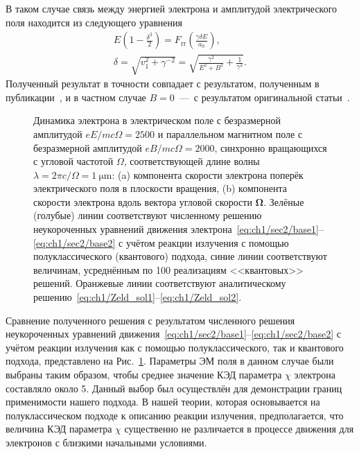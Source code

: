 В таком случае связь между энергией электрона и амплитудой электрического поля находится из следующего уравнения
\begin{gather}
    E \left(1 - \frac{\delta^2}{2}\right) = F_\mathrm{rr}\left(\frac{\gamma\delta E}{a_\mathrm{S}}\right) , \\
    \delta = \sqrt{v_1^2 + \gamma^{-2}} = \sqrt{\frac{\gamma^2}{E^2 + B^2} + \frac{1}{\gamma^2}}.
\end{gather}
Полученный результат в точности совпадает с результатом, полученным в публикации~\cite{Kostyukov2016}, и в частном случае $B=0$~---~с результатом оригинальной статьи~\cite{Zeldovich75}.
\begin{figure}[ht]
    \caption[Динамика электрона в синхронно вращающихся однородных параллельных электрическом и магнитном полях]{
    Динамика электрона в электрическом поле с безразмерной амплитудой $eE/mc\Omega = \num{2500}$ и параллельном магнитном поле с безразмерной амплитудой $eB/mc\Omega = \num{2000}$, синхронно вращающихся с угловой частотой $\Omega$, соответствующей длине волны $\lambda = 2\pi c /\Omega = \SI{1}{\um}$: (a) компонента скорости электрона поперёк электрического поля в плоскости вращения, (b) компонента скорости электрона вдоль вектора угловой скорости $\symbf{\Omega}$. Зелёные (голубые) линии соответствуют численному решению неукороченных уравнений движения электрона~\eqref{eq:ch1/sec2/base1}--\eqref{eq:ch1/sec2/base2} с учётом реакции излучения с помощью полуклассического (квантового) подхода, синие линии соответствуют величинам, усреднённым по 100 реализациям <<квантовых>> решений. Оранжевые линии соответствуют аналитическому решению~\eqref{eq:ch1/Zeld_sol1}--\eqref{eq:ch1/Zeld_sol2}.}
    \label{fig:ch1/sec5/zeldovich}
\end{figure}
Сравнение полученного решения с результатом численного решения неукороченных уравнений движения~\eqref{eq:ch1/sec2/base1}--\eqref{eq:ch1/sec2/base2} с учётом реакции излучения как с помощью полуклассического, так и квантового подхода, представлено на Рис.~\ref{fig:ch1/sec5/zeldovich}.
Параметры ЭМ поля в данном случае были выбраны таким образом, чтобы среднее значение КЭД параметра $\chi$ электрона составляло около 5.
Данный выбор был осуществлён для демонстрации границ применимости нашего подхода.
В нашей теории, которая основывается на полуклассическом подходе к описанию реакции излучения, предполагается, что величина КЭД параметра $\chi$ существенно не различается в процессе движения для электронов с близкими начальными условиями.
